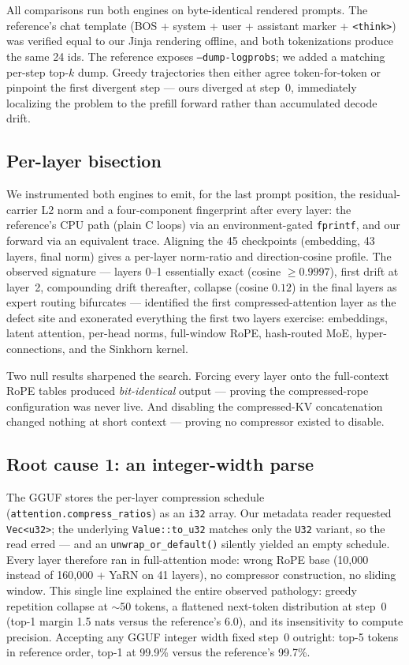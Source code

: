\documentclass[11pt]{article}
\begin{document}
All comparisons run both engines on byte-identical rendered prompts. The
reference's chat template (BOS + system + user + assistant marker +
\texttt{<think>}) was verified equal to our Jinja rendering offline, and
both tokenizations produce the same 24 ids. The reference exposes
\texttt{--dump-logprobs}; we added a matching per-step top-$k$ dump.
Greedy trajectories then either agree token-for-token or pinpoint the
first divergent step --- ours diverged at step~0, immediately localizing
the problem to the prefill forward rather than accumulated decode drift.

\subsection{Per-layer bisection}

We instrumented both engines to emit, for the last prompt position, the
residual-carrier L2 norm and a four-component fingerprint after every
layer: the reference's CPU path (plain C loops) via an environment-gated
\texttt{fprintf}, and our forward via an equivalent trace. Aligning the 45
checkpoints (embedding, 43 layers, final norm) gives a per-layer
norm-ratio and direction-cosine profile. The observed signature ---
layers 0--1 essentially exact (cosine $\geq 0.9997$), first drift at
layer~2, compounding drift thereafter, collapse (cosine $0.12$) in the
final layers as expert routing bifurcates --- identified the first
compressed-attention layer as the defect site and exonerated everything
the first two layers exercise: embeddings, latent attention, per-head
norms, full-window RoPE, hash-routed MoE, hyper-connections, and the
Sinkhorn kernel.

Two null results sharpened the search. Forcing every layer onto the
full-context RoPE tables produced \emph{bit-identical} output --- proving
the compressed-rope configuration was never live. And disabling the
compressed-KV concatenation changed nothing at short context --- proving
no compressor existed to disable.

\subsection{Root cause 1: an integer-width parse}

The GGUF stores the per-layer compression schedule
(\texttt{attention.compress\_ratios}) as an \texttt{i32} array. Our
metadata reader requested \texttt{Vec<u32>}; the underlying
\texttt{Value::to\_u32} matches only the \texttt{U32} variant, so the read
erred --- and an \texttt{unwrap\_or\_default()} silently yielded an empty
schedule. Every layer therefore ran in full-attention mode: wrong RoPE
base (10{,}000 instead of 160{,}000 + YaRN on 41 layers), no compressor
construction, no sliding window. This single line explained the entire
observed pathology: greedy repetition collapse at $\sim$50 tokens, a
flattened next-token distribution at step~0 (top-1 margin 1.5 nats versus
the reference's 6.0), and its insensitivity to compute precision.
Accepting any GGUF integer width fixed step~0 outright: top-5 tokens in
reference order, top-1 at 99.9\% versus the reference's 99.7\%.
\end{document}
